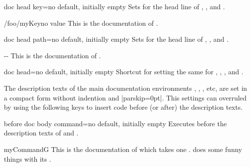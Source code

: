 \begin{docTcbKey}{doc head key}{=}{no default, initially empty}
  Sets  for the head line of
  , , and .
\begin{dispExample}

\begin{docKey}{/foo/myKey}{}{no value}
  This is the documentation of .
\end{docKey}
\end{dispExample}
\end{docTcbKey}


\begin{docTcbKey}[][doc new=2019-09-18]{doc head path}{=}{no default, initially empty}
  Sets  for the head line of
  , , and .
\begin{dispExample}

\begin{docPathOperation*}{-{}-}{}
  This is the documentation of .
\end{docPathOperation*}
\end{dispExample}
\end{docTcbKey}


\begin{docTcbKey}[][doc updated=2019-09-18]{doc head}{=}{no default, initially empty}
  Shortcut for setting the same  for
  , ,
  , and .
\end{docTcbKey}


\clearpage

The description texts of the main documentation environments ,
, , etc, are set in a compact form without
indention and |parskip=0pt|. This settings can overruled by using the following
keys to insert code before (or after) the description texts.

\begin{docTcbKey}[][doc new=2015-10-09]{before doc body command}{=}{no default, initially empty}
  Executes  before the description texts
  of  and .
\begin{dispExample}

\begin{docCommand*}{myCommandG}{}
  This is the documentation of  which takes one .
   does some funny things with its .
\end{docCommand*}
\end{dispExample}
\end{docTcbKey}


